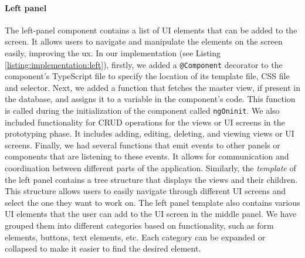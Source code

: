 \paragraph{Left panel}
The left-panel component contains a list of UI elements that can be added to the screen.
It allows users to navigate and manipulate the elements on the screen easily, improving the \ac{ux}.
In our implementation (see Listing \ref{listing:implementation:left}), firstly, we added a \texttt{@Component} decorator to the component's TypeScript file to specify the location of its template file, CSS file and selector.
Next, we added a function that fetches the master view, if present in the database, and assigns it to a variable in the component's code. 
This function is called during the initialization of the component called \texttt{ngOninit}. 
We also included functionality for CRUD operations for the views or UI screens in the prototyping phase. 
It includes adding, editing, deleting, and viewing views or UI screens. 
Finally, we had several functions that emit events to other panels or components that are listening to these events. 
It allows for communication and coordination between different parts of the application.
Similarly, the \textit{template} of the left panel contains a tree structure that displays the views and their children. 
This structure allows users to easily navigate through different UI screens and select the one they want to work on. 
The left panel template also contains various UI elements that the user can add to the UI screen in the middle panel.
We have grouped them into different categories based on functionality, such as form elements, buttons, text elements, etc. 
Each category can be expanded or collapsed to make it easier to find the desired element.

